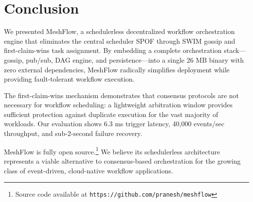 \section{Conclusion}

We presented MeshFlow, a schedulerless decentralized workflow orchestration engine that eliminates the central scheduler SPOF through SWIM gossip and first-claim-wins task assignment. By embedding a complete orchestration stack---gossip, pub/sub, DAG engine, and persistence---into a single 26 MB binary with zero external dependencies, MeshFlow radically simplifies deployment while providing fault-tolerant workflow execution.

The first-claim-wins mechanism demonstrates that consensus protocols are not necessary for workflow scheduling: a lightweight arbitration window provides sufficient protection against duplicate execution for the vast majority of workloads. Our evaluation shows 6.3 ms trigger latency, 40,000 events/sec throughput, and sub-2-second failure recovery.

MeshFlow is fully open source.\footnote{Source code available at \texttt{https://github.com/pranesh/meshflow}} We believe its schedulerless architecture represents a viable alternative to consensus-based orchestration for the growing class of event-driven, cloud-native workflow applications.
